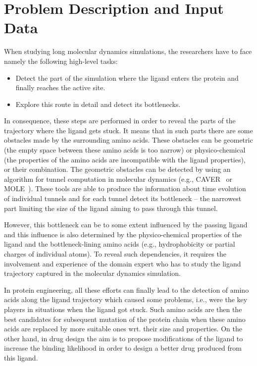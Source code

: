 \documentclass[twocolumn]{bmcart}%
\begin{document}
\section*{Problem Description and Input Data}
When studying long molecular dynamics simulations, the researchers have to face namely the following high-level tasks:
\begin{itemize}
\item Detect the part of the simulation where the ligand enters the protein and finally reaches the active site.
\item Explore this route in detail and detect its bottlenecks.
\end{itemize}
In consequence, these steps are performed in order to reveal the parts of the trajectory where the ligand gets stuck.
It means that in such parts there are some obstacles made by the surrounding amino acids.
These obstacles can be geometric (the empty space between these amino acids is too narrow) or physico-chemical (the properties of the amino acids are incompatible with the ligand properties), or their combination.
The geometric obstacles can be detected by using an algorithm for tunnel computation in molecular dynamics (e.g., CAVER~\cite{Chovancova2012} or MOLE~\cite{Sehnal2013}).
These tools are able to produce the information about time evolution of individual tunnels and for each tunnel detect its bottleneck -- the narrowest part limiting the size of the ligand aiming to pass through this tunnel.

However, this bottleneck can be to some extent influenced by the passing ligand and this influence is also determined by the physico-chemical properties of the ligand and the bottleneck-lining amino acids (e.g., hydrophobicity or partial charges of individual atoms).
To reveal such dependencies, it requires the involvement and experience of the domain expert who has to study the ligand trajectory captured in the molecular dynamics simulation.

In protein engineering, all these efforts can finally lead to the detection of amino acids along the ligand trajectory which caused some problems, i.e., were the key players in situations when the ligand got stuck.
Such amino acids are then the best candidates for subsequent mutation of the protein chain when these amino acids are replaced by more suitable ones wrt. their size and properties.
On the other hand, in drug design the aim is to propose modifications of the ligand to increase the binding likelihood in order to design a better drug produced from this ligand.
\end{document}
